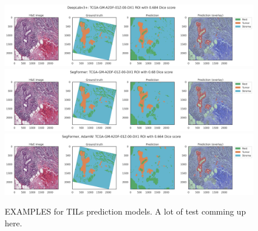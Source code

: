 \begin{figure}
\includegraphics[width=\linewidth]{figures/tissue/deeplabv3+_dice_tcga_TCGA-GM-A2DF-01Z-00-DX1.CD0BE6D7-2DB3-4193-84CC-F9BE7BF18CC2_[25322, 21890, 27778, 24293]_check.png}
\includegraphics[width=\linewidth]{figures/tissue/segformer_dice_tcga_TCGA-GM-A2DF-01Z-00-DX1.CD0BE6D7-2DB3-4193-84CC-F9BE7BF18CC2_[25322, 21890, 27778, 24293]_check.png}
\includegraphics[width=\linewidth]{figures/tissue/segformer,_adamw_dice_tcga_TCGA-GM-A2DF-01Z-00-DX1.CD0BE6D7-2DB3-4193-84CC-F9BE7BF18CC2_[25322, 21890, 27778, 24293]_check.png}

\caption{EXAMPLES for TILs prediction models. A lot of test comming up here.}
\label{fig:figure3}
\end{figure}

